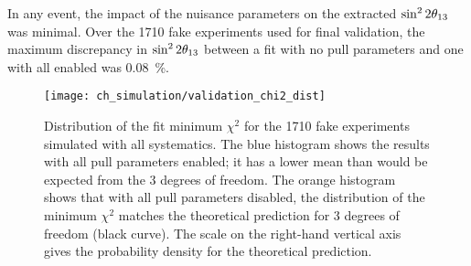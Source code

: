 In any event, the impact of the nuisance parameters
on the extracted $\sin^22\theta_{13}{}$ was minimal.
Over the 1710 fake experiments used for final validation, the maximum discrepancy in $\sin^22\theta_{13}{}$
between a fit with no pull parameters and one with all enabled
was \SI{0.08}{\percent}.

\begin{figure}
    \centering
    \texttt{[image: ch\_simulation/validation\_chi2\_dist]}
    \caption[Fitter validation $\chi^2$ distribution]{
        Distribution of the fit minimum $\chi^2$
        for the \num{1710} fake experiments
        simulated with all systematics.
        The blue histogram shows the results with all pull parameters enabled;
        it has a lower mean than would be expected from the 3 degrees of freedom.
        The orange histogram shows that with all pull parameters disabled,
        the distribution of the minimum $\chi^2$ matches the theoretical prediction
        for 3 degrees of freedom (black curve).
        The scale on the right-hand vertical axis gives the probability density
        for the theoretical prediction.
    }
    \label{fig:validation_chi2}
\end{figure}


